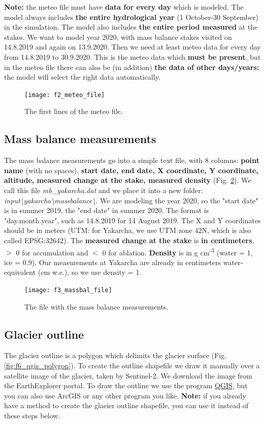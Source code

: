 \documentclass[15pt]{extarticle}
\begin{document}
\textbf{Note:} the meteo file must have \textbf{data for every day} which is modeled. The model always includes \textbf{the entire hydrological year} (1 October-30 September) in the simulation. The model also includes \textbf{the entire period measured} at the stakes. We want to model year 2020, with mass balance stakes visited on 14.8.2019 and again on 13.9.2020. Then we need at least meteo data for every day from 14.8.2019 to 30.9.2020. This is the meteo data which \textbf{must be present}, but in the meteo file there can also be (in addition) \textbf{the data of other days/years:} the model will select the right data automatically.

\begin{figure}[h]
    \centering
    \texttt{[image: f2\_meteo\_file]}
    \caption{The first lines of the meteo file.}
    \label{fig:f2_meteo_file}
\end{figure}


\subsection{Mass balance measurements}
\label{sect:input_mb}
The mass balance measurements go into a simple text file, with 8 columns: \textbf{point name} (with no spaces), \textbf{start date, end date, X coordinate, Y coordinate, altitude, measured change at the stake, measured density} (Fig. \ref{fig:f3_massbal_file}). We call this file \textit{mb\_yakarcha.dat} and we place it into a new folder: \textit{input\textbackslash yakarcha\textbackslash massbalance\textbackslash}. We are modeling the year 2020, so the "start date" is in summer 2019, the "end date" in summer 2020. The format is "day.month.year", such as 14.8.2019 for 14 August 2019. The X and Y coordinates should be in meters (UTM: for Yakarcha, we use UTM zone 42N, which is also called EPSG:32642). The \textbf{measured change at the stake} is \textbf{in centimeters}, $>$ 0 for accumulation and $<$ 0 for ablation. \textbf{Density} is in g cm\textsuperscript{-3} (water = 1, ice = 0.9). Our measurements at Yakarcha are already in centimeters water-equivalent (cm w.e.), so we use density = 1.

\begin{figure}[h]
    \centering
    \texttt{[image: f3\_massbal\_file]}
    \caption{The file with the mass balance measurements.}
    \label{fig:f3_massbal_file}
\end{figure}



\subsection{Glacier outline}
\label{sect:input_outline}
The glacier outline is a polygon which delimits the glacier surface (Fig. \ref{fig:f6_qgis_polygon}). To create the outline shapefile we draw it manually over a satellite image of the glacier, taken by Sentinel-2. We download the image from the EarthExplorer portal. To draw the outline we use the program \href{https://qgis.org}{QGIS}, but you can also use ArcGIS or any other program you like. \textbf{Note:} if you already have a method to create the glacier outline shapefile, you can use it instead of these steps below.
\end{document}
